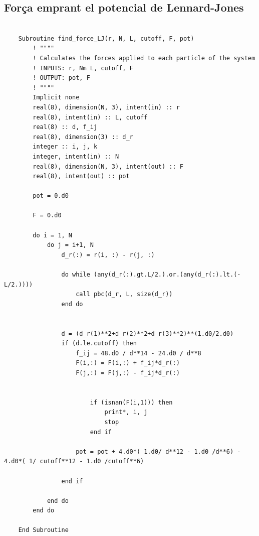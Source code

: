 \documentclass[a4paper,10pt]{article}
\begin{document}
\subsection{Força emprant el potencial de Lennard-Jones}

\begin{lstlisting}
	
	Subroutine find_force_LJ(r, N, L, cutoff, F, pot)
		! """"
		! Calculates the forces applied to each particle of the system
		! INPUTS: r, Nm L, cutoff, F
		! OUTPUT: pot, F
		! """"
		Implicit none
		real(8), dimension(N, 3), intent(in) :: r
		real(8), intent(in) :: L, cutoff
		real(8) :: d, f_ij
		real(8), dimension(3) :: d_r
		integer :: i, j, k
		integer, intent(in) :: N
		real(8), dimension(N, 3), intent(out) :: F
		real(8), intent(out) :: pot
		
		pot = 0.d0
		
		F = 0.d0
		
		do i = 1, N
			do j = i+1, N
				d_r(:) = r(i, :) - r(j, :)
				
				do while (any(d_r(:).gt.L/2.).or.(any(d_r(:).lt.(-L/2.))))
					call pbc(d_r, L, size(d_r))
				end do
				
				
				d = (d_r(1)**2+d_r(2)**2+d_r(3)**2)**(1.d0/2.d0)
				if (d.le.cutoff) then
					f_ij = 48.d0 / d**14 - 24.d0 / d**8
					F(i,:) = F(i,:) + f_ij*d_r(:)
					F(j,:) = F(j,:) - f_ij*d_r(:)
				
				
						if (isnan(F(i,1))) then
							print*, i, j
							stop
						end if
				
					pot = pot + 4.d0*( 1.d0/ d**12 - 1.d0 /d**6) - 4.d0*( 1/ cutoff**12 - 1.d0 /cutoff**6)
				
				end if 
			
			end do
		end do
	
	End Subroutine
\end{lstlisting}
\end{document}

